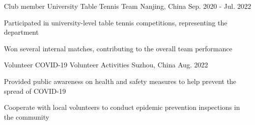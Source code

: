 

\begin{cventries}
  \cventry
    {Club member} %
    {University Table Tennis Team} %
    {Nanjing, China} %
    {Sep. 2020 - Jul. 2022} %
    {
      \begin{cvitems} %
        \item {Participated in university-level table tennis competitions, representing the department}
        \item {Won several internal matches, contributing to the overall team performance}
      \end{cvitems}
    }
    
  \vspace{0.9cm}
  \cventry
    {Volunteer} %
    {COVID-19 Volunteer Activities} %
    {Suzhou, China} %
    {Aug. 2022} %
    {
      \begin{cvitems} %
        \item {Provided public awareness on health and safety measures to help prevent the spread of COVID-19}
        \item {Cooperate with local volunteers to conduct epidemic prevention inspections in the community}
      \end{cvitems}
    }
    \vspace{0.2cm}
\end{cventries}


